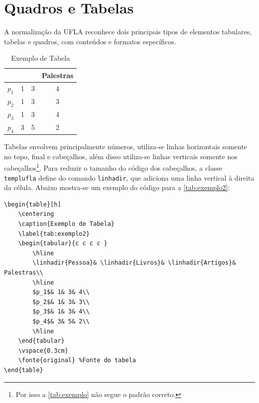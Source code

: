 \section{Quadros e Tabelas}\label{sec:tabelasUFLA}

A normalização da UFLA reconhece dois principais tipos de elementos tabulares, tabelas e quadros, com conteúdos e formatos específicos. 

\begin{table}[h]
	\centering
	\caption{Exemplo de Tabela} 
	\label{tab:exemplo2}
	\begin{tabular}{c c c c }
		\hline
		\linhadir{\bf Pessoa} & \linhadir{\bf Livros} & \linhadir{\bf Artigos} & \bf Palestras \\
		\hline
		$p_1$ & 1 & 3 & 4 \\
		$p_2$ & 1 & 3 & 3 \\
		$p_3$ & 1 & 3 & 4 \\
		$p_4$ & 3 & 5 & 2 \\
		\hline 
	\end{tabular}
	\vspace{0.3cm}
\end{table}

Tabelas envolvem principalmente números, utiliza-se linhas horizontais somente no topo, final e cabeçalhos, além disso utiliza-se linhas verticais somente nos cabeçalhos\footnote{Por isso a \autoref{tab:exemplo} não segue o padrão correto.}. Para reduzir o tamanho do código dos cabeçalhos, a classe \texttt{templufla} define do comando \texttt{linhadir}, que adiciona uma linha vertical à direita da célula. Abaixo mostra-se um exemplo do código para a \autoref{tab:exemplo2}:
\begin{lstlisting}[language={[LaTeX]Tex}]
\begin{table}[h]
	\centering
	\caption{Exemplo de Tabela} 
	\label{tab:exemplo2}
	\begin{tabular}{c c c c }
		\hline
		\linhadir{Pessoa}& \linhadir{Livros}& \linhadir{Artigos}& Palestras\\
		\hline
		$p_1$& 1& 3& 4\\
		$p_2$& 1& 3& 3\\
		$p_3$& 1& 3& 4\\
		$p_4$& 3& 5& 2\\
		\hline 
	\end{tabular}
	\vspace{0.3cm}
	\fonte{original} %Fonte do tabela
\end{table}
\end{lstlisting}


